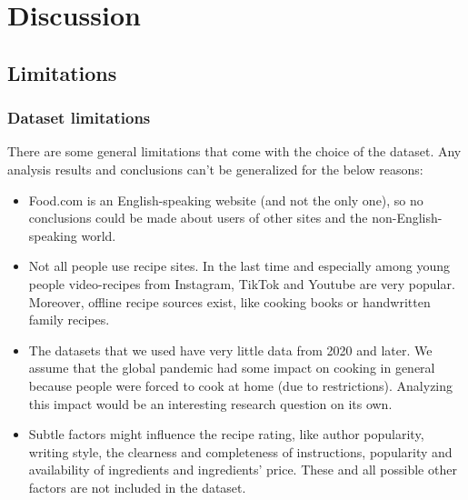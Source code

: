 \documentclass{article}
\begin{document}
\section{Discussion}
\subsection{Limitations}
\subsubsection{Dataset limitations}
There are some general limitations that come with the choice of the dataset. Any analysis results and conclusions can't be generalized for the below reasons:
\begin{itemize}[noitemsep,topsep=5pt]
\item Food.com is an English-speaking website (and not the only one), so no conclusions could be made about users of other sites and the non-English-speaking world.
\item  Not all people use recipe sites. In the last time and especially among young people video-recipes from Instagram, TikTok and Youtube are very popular. Moreover, offline recipe sources exist, like cooking books or handwritten family recipes.
\item  The datasets that we used have very little data from 2020 and later. We assume that the global pandemic had some impact on cooking in general because people were forced to cook at home (due to restrictions). Analyzing this impact would be an interesting research question on its own. 
\item  Subtle factors might influence the recipe rating, like author popularity, writing style, the clearness and completeness of instructions, popularity and availability of ingredients and ingredients' price. These and all possible other factors are not included in the dataset.
\end{itemize}
\end{document}
